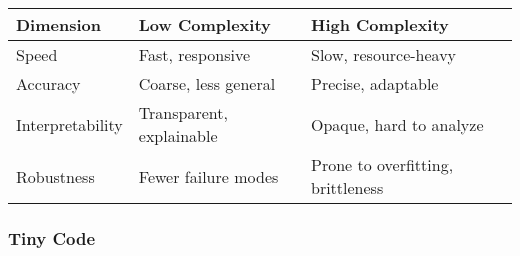 \documentclass[
  letterpaper,
  DIV=11,
  numbers=noendperiod]{scrreprt}
\begin{document}
\begin{longtable}[]{@{}
  >{\raggedright\arraybackslash}p{}
  >{\raggedright\arraybackslash}p{}
  >{\raggedright\arraybackslash}p{}@{}}
\toprule\noalign{}
\begin{minipage}[b]{\linewidth}\raggedright
Dimension
\end{minipage} & \begin{minipage}[b]{\linewidth}\raggedright
Low Complexity
\end{minipage} & \begin{minipage}[b]{\linewidth}\raggedright
High Complexity
\end{minipage} \\
\midrule\noalign{}
\endhead
\bottomrule\noalign{}
\endlastfoot
Speed & Fast, responsive & Slow, resource-heavy \\
Accuracy & Coarse, less general & Precise, adaptable \\
Interpretability & Transparent, explainable & Opaque, hard to analyze \\
Robustness & Fewer failure modes & Prone to overfitting, brittleness \\
\end{longtable}

\subsubsection{Tiny Code}\label{tiny-code-38}
\end{document}
